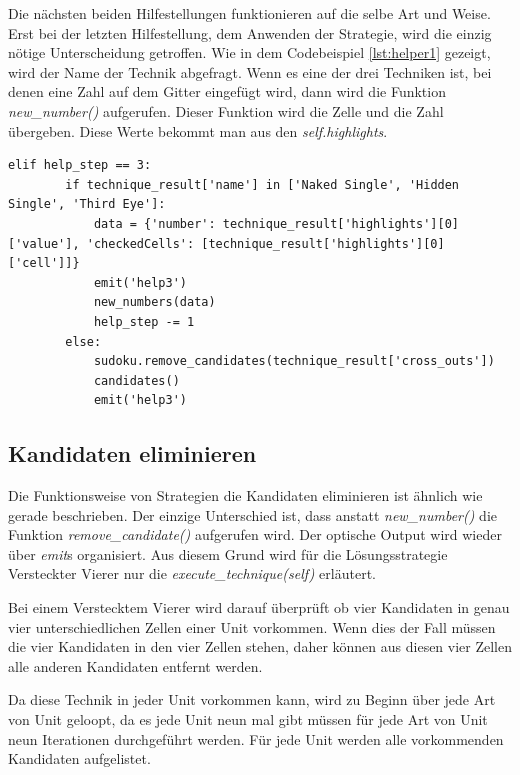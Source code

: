 Die nächsten beiden Hilfestellungen funktionieren auf die selbe Art und Weise. Erst bei der letzten Hilfestellung, dem Anwenden der Strategie, wird die einzig nötige Unterscheidung getroffen. Wie in dem Codebeispiel \ref{lst:helper1} gezeigt, wird der Name der Technik abgefragt. Wenn es eine der drei Techniken ist, bei denen eine Zahl auf dem Gitter eingefügt wird, dann wird die Funktion \textit{new\_number()} aufgerufen. Dieser Funktion wird die Zelle und die Zahl übergeben. Diese Werte bekommt man aus den \textit{self.highlights}.

\begin{lstlisting}[caption={Serverseitige Unterscheidung der zwei Arten von Techniken}, label={lst:helper1}]
	elif help_step == 3:
		if technique_result['name'] in ['Naked Single', 'Hidden Single', 'Third Eye']:
			data = {'number': technique_result['highlights'][0]['value'], 'checkedCells': [technique_result['highlights'][0]['cell']]}
			emit('help3')
			new_numbers(data)
			help_step -= 1
		else:
			sudoku.remove_candidates(technique_result['cross_outs'])
			candidates()
			emit('help3')
\end{lstlisting}


\subsection{Kandidaten eliminieren}

Die Funktionsweise von Strategien die Kandidaten eliminieren ist ähnlich wie gerade beschrieben. Der einzige Unterschied ist, dass anstatt \textit{new\_number()} die Funktion \textit{remove\_candidate()} aufgerufen wird. Der optische Output wird wieder über \textit{emit}s organisiert. Aus diesem Grund wird für die Lösungsstrategie Versteckter Vierer nur die \textit{execute\_technique(self)} erläutert. 

Bei einem Verstecktem Vierer wird darauf überprüft ob vier Kandidaten in genau vier unterschiedlichen Zellen einer Unit vorkommen. Wenn dies der Fall müssen die vier Kandidaten in den vier Zellen stehen, daher können aus diesen vier Zellen alle anderen Kandidaten entfernt werden.

Da diese Technik in jeder Unit vorkommen kann, wird zu Beginn über jede Art von Unit geloopt, da es jede Unit neun mal gibt müssen für jede Art von Unit neun Iterationen durchgeführt werden. Für jede Unit werden alle vorkommenden Kandidaten aufgelistet.

